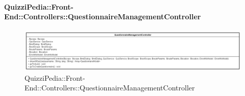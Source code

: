 \paragraph[QuizziPedia::Front-End::Controllers\\::QuestionnaireManagementController]{QuizziPedia::Front-End::Controllers::QuestionnaireManagementController}
\begin{figure} [ht]
	\centering
	\includegraphics[scale=0.3]{UML/Classi/Front-End/QuizziPedia_Front-end_Controller_QuestionnaireManagementController.png}
	\caption{QuizziPedia::Front-End::Controllers::QuestionnaireManagementController}
\end{figure} \FloatBarrier
